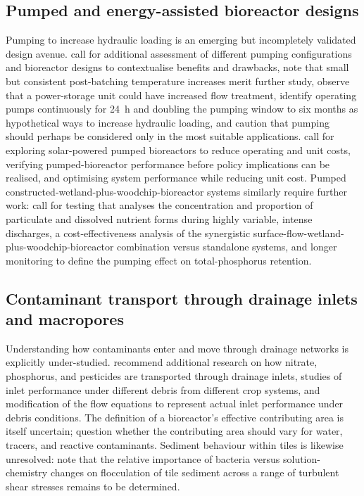 \documentclass[11pt]{article}
\begin{document}
\subsection{Pumped and energy-assisted bioreactor designs}
Pumping to increase hydraulic loading is an emerging but incompletely validated design avenue. \textcite{DíazGarcía2025} call for additional assessment of different pumping configurations and bioreactor designs to contextualise benefits and drawbacks, note that small but consistent post-batching temperature increases merit further study, observe that a power-storage unit could have increased flow treatment, identify operating pumps continuously for 24~h and doubling the pumping window to six months as hypothetical ways to increase hydraulic loading, and caution that pumping should perhaps be considered only in the most suitable applications. \textcite{Hartfiel2024} call for exploring solar-powered pumped bioreactors to reduce operating and unit costs, verifying pumped-bioreactor performance before policy implications can be realised, and optimising system performance while reducing unit cost. Pumped constructed-wetland-plus-woodchip-bioreactor systems similarly require further work: \textcite{Pugliese2020} call for testing that analyses the concentration and proportion of particulate and dissolved nutrient forms during highly variable, intense discharges, a cost-effectiveness analysis of the synergistic surface-flow-wetland-plus-woodchip-bioreactor combination versus standalone systems, and longer monitoring to define the pumping effect on total-phosphorus retention.

\subsection{Contaminant transport through drainage inlets and macropores}
Understanding how contaminants enter and move through drainage networks is explicitly under-studied. \textcite{Li2017b} recommend additional research on how nitrate, phosphorus, and pesticides are transported through drainage inlets, studies of inlet performance under different debris from different crop systems, and modification of the flow equations to represent actual inlet performance under debris conditions. The definition of a bioreactor's effective contributing area is itself uncertain; \textcite{Akay2008} question whether the contributing area should vary for water, tracers, and reactive contaminants. Sediment behaviour within tiles is likewise unresolved: \textcite{Stone1997} note that the relative importance of bacteria versus solution-chemistry changes on flocculation of tile sediment across a range of turbulent shear stresses remains to be determined.
\end{document}
